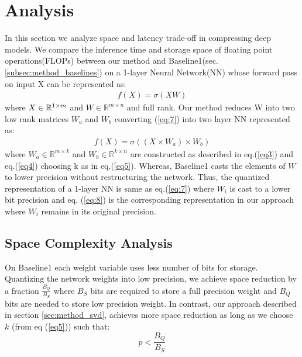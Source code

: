 \section{Analysis}
\label{sec: analysis}
In this section we analyze space and latency trade-off in compressing deep
models. We compare the inference time and storage space of floating point operations(FLOPs) between our method and Baseline1(sec.\ref{subsec:method_baselines})  on a 1-layer Neural Network(NN) whose forward pass on input X can be represented as:
\begin{align}\label{eq:7}
f(X) = \sigma(XW) 
\end{align}
where $X \in \mathbb{R}^{1 \times m} \notag $ and $W \in \mathbb{R}^{m \times
  n}$ and full rank. Our method reduces W into two low rank matrices $W_a$
and $W_b$ converting (\ref{eq:7}) into two layer NN represented as:
\begin{align}
\label{eq:8}
f(X) = \sigma ((X\times W_a)\times W_b)
\end{align}
where $W_a \in \mathbb{R}^{m \times k}$ and $W_b \in \mathbb{R}^{k \times n}$
are constructed as described in eq.(\ref{eq3}) and eq.(\ref{eq4}) choosing k as
in eq.(\ref{eq5}).
Whereas, Baseline1 casts the elements of $W$ to lower
precision without restructuring the network. Thus, the quantized representation
of a 1-layer NN is same as eq.(\ref{eq:7}) where $W_i$ is cast to a lower bit
precision and eq. (\ref{eq:8}) is the corresponding representation in our approach
where $W_i$ remains in its original precision.
\subsection{Space Complexity Analysis}
\label{sec:analysis_space}
On Baseline1 each weight variable uses less number of bits for
storage. 
Quantizing the network weights into
low precision, we achieve space reduction by a fraction $\frac{B_Q}{B_S}$ where $B_S$ bits are required to store a full precision weight and $B_Q$ bits are needed to store low precision weight. In contrast, our approach described in section \ref{sec:method_svd}, achieves more
space reduction as long as we choose $k$ (from eq (\ref{eq5})) such that:
\begin{equation} \label{eq:9}
p < \frac{B_Q}{B_S}
\end{equation}
